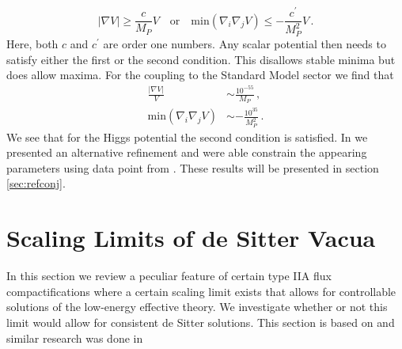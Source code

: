 \documentclass[12pt]{report}
\newcommand{\be}{\begin{equation}}
\newcommand{\ee}{\end{equation}}
\newcommand{\bea}{\begin{equation}\begin{aligned}}
\newcommand{\eea}{\end{aligned}\end{equation}}
\begin{document}
\be
|\nabla V| \geq \frac{c}{M_P} V\quad \text{or} \quad \text{min}(\nabla_i \nabla_j V) \leq - \frac{c^\prime}{M_P^2} V\,.
\label{eq:dScon}
\ee
Here, both $c$ and $c^\prime$ are order one numbers. Any scalar potential then needs to satisfy either the first or the second condition. This disallows stable minima but does allow maxima. For the coupling to the Standard Model sector we find that 
\bea 
\frac{|\nabla V|}{V} &\sim \frac{10^{-55}}{M_P}\,,\\
\text{min}(\nabla_i \nabla_j V) &\sim -\frac{10^ {35}}{M_P^ 2}\,.
\eea 
We see that for the Higgs potential the second condition is satisfied. In \cite{Andriot:2018mav} we presented an alternative refinement and were able constrain the appearing parameters using data point from \cite{Roupec:2018mbn}. These results will be presented in section \ref{sec:refconj}.

\section{Scaling Limits of de Sitter Vacua}
In this section we review a peculiar feature of certain type IIA flux compactifications where a certain scaling limit exists that allows for controllable solutions of the low-energy effective theory. We investigate whether or not this limit would allow for consistent de Sitter solutions. This section is based on \cite{Banlaki:2018ayh} and similar research was done in \cite{Junghans:2018gdb}
\end{document}
